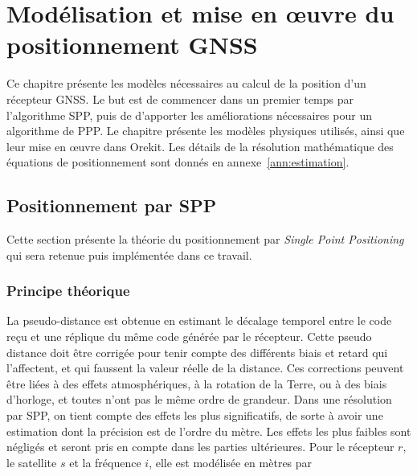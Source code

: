 \chapter{Modélisation et mise en œuvre du positionnement GNSS}
\label{chap:modelisation}

Ce chapitre présente les modèles nécessaires au calcul de la position d'un
récepteur GNSS. Le but est de commencer dans un premier temps par l'algorithme SPP, puis de d'apporter les améliorations nécessaires pour un algorithme de PPP.
Le chapitre présente les modèles physiques utilisés, ainsi que leur mise en œuvre dans Orekit.
Les détails de la résolution mathématique des équations de positionnement sont donnés en annexe~\ref{ann:estimation}.

\section{Positionnement par SPP}

Cette section présente la théorie du positionnement par \emph{Single Point Positioning} qui sera retenue puis implémentée dans ce travail.

\subsection{Principe théorique}

La pseudo-distance est obtenue en estimant le décalage temporel entre le code
reçu et une réplique du même code générée par le récepteur. Cette pseudo distance doit être corrigée
pour tenir compte des différents biais et retard qui l'affectent, et qui faussent la valeur réelle de la distance.
Ces corrections peuvent être liées à des effets atmosphériques, à la rotation de la Terre, ou à des biais d'horloge, et toutes n'ont pas
le même ordre de grandeur. Dans une résolution par SPP, on tient compte des effets les plus significatifs, de sorte à avoir une estimation 
dont la précision est de l'ordre du mètre. Les effets les plus faibles sont négligés et seront pris en compte dans les parties ultérieures.
Pour le récepteur
$r$, le satellite $s$ et la fréquence $i$, elle est modélisée en mètres par

